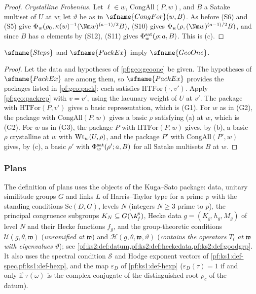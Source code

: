 \begin{proof}
\emph{Crystalline Frobenius.} Let $\ell\in w$, $\mathrm{CongAll}(P,w)$, and $B$ a Satake multiset of $U$
at $w$; let $\vartheta$ be as in $\sfname{CongFor}(w,B)$. As before (S6) and (S5) give
$\geoPhiK_w(\rho_0,\kappa(w)^{-1}(\Nm w)^{(a-1)/2}B)$, (S10) gives $\geoPhiK_w(\rho,(\Nm w)^{(a-1)/2}B)$,
and since $B$ has $a$ elements by (S12), (S11) gives $\Phi^{\mathrm{sat}}_w(\rho;a,B)$. This is (c).
\end{proof}

\begin{theorem}\label{pf:geo:geooneof}
$\sfname{Steps}$ and $\sfname{PackEx}$ imply $\sfname{GeoOne}$.
\end{theorem}

\begin{proof}
Let the data and hypotheses of \cref{pf:geo:geoone} be given. The hypotheses of $\sfname{PackEx}$ are
among them, so $\sfname{PackEx}$ provides the packages listed in \cref{pf:geo:pack}; each satisfies
$\mathrm{HTFor}(\cdot,v')$. Apply \cref{pf:geo:packrep} with $v=v'$, using the lacunary weight of $U$
at $v'$. The package with $\mathrm{HTFor}(P,v')$ gives a basic representation, which is (G1). For $w$ as
in (G2), the package with $\mathrm{CongAll}(P,w)$ gives a basic $\rho$ satisfying (a) at $w$, which is
(G2). For $w$ as in (G3), the package $P$ with $\mathrm{HTFor}(P,w)$ gives, by (b), a basic $\rho$
crystalline at $w$ with $\mathrm{Wt}_w(U,\rho)$, and the package $P'$ with $\mathrm{CongAll}(P',w)$ gives, by
(c), a basic $\rho'$ with $\Phi^{\mathrm{sat}}_w(\rho';a,B)$ for all Satake multisets $B$ at $w$.
\end{proof}

\subsubsection{Plans}

The definition of plans uses the objects of the Kuga--Sato package: data, unitary similitude
groups $G$ and links $L$ of Harris--Taylor type for a prime $p$ with the standing conditions
$\mathrm{Sc}(D,G)$, levels $N$ (integers $N\ge3$ prime to $p$), the principal congruence subgroups
$K_N\subseteq G(\A_f^p)$, Hecke data $g=(K_g,h_g,M_g)$ of level $N$ and their Hecke functions $f_g$, and
the group-theoretic conditions $\mathcal U(g,\theta,\mathfrak w)$ (\emph{unramified at $\mathfrak w$}) and
$\mathcal H(g,\theta,\mathfrak w,\vartheta)$ (\emph{contains the operators $T_i$ at $\mathfrak w$ with
eigenvalues $\vartheta$}); see \cref{pf:ks2:def:datum,pf:ks2:def:heckedata,pf:ks2:def:goodgrp}. It also uses
the spectral condition $\mathcal S$ and Hodge exponent vectors of \cref{pf:ks1:def-spec,pf:ks1:def-hexp},
and the map $\varepsilon_D$ of \cref{pf:ks1:def-hexp} ($\varepsilon_D(\tau)=1$ if and only if $\tau(\omega)$ is the
complex conjugate of the distinguished root $\rho_c$ of the datum).

